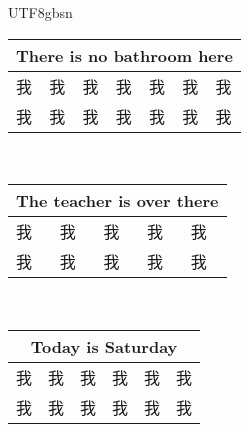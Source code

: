 \documentclass{article}
\newlength\mycolw
\newcommand{\myfont}{gbsn} %
\begin{document}
\begin{CJK}{UTF8}{\myfont}
\begin{tabular}{|p{\mycolw}|p{\mycolw}|p{\mycolw}|p{\mycolw}|p{\mycolw}|p{\mycolw}|p{\mycolw}|}
\multicolumn{7}{|c|}{There is no bathroom here} \\ \hline
\color{white} 我 &\color{white} 我 &\color{white} 我 &\color{white} 我 &\color{white} 我 &\color{white} 我 & \color{white} 我 \\ \hline
\color{white} 我 &\color{white} 我 &\color{white} 我 &\color{white} 我 &\color{white} 我 &\color{white} 我 & \color{white} 我 \\ \hline
\end{tabular}
\\ \vspace{0.3 in}
\setlength{}
\addtolength\mycolw{-2\tabcolsep}
\begin{tabular}{|p{\mycolw}|p{\mycolw}|p{\mycolw}|p{\mycolw}|p{\mycolw}|} \hline
\multicolumn{5}{|c|}{The teacher is over there} \\ \hline
\color{white} 我 &\color{white} 我 &\color{white} 我 &\color{white} 我 & \color{white} 我 \\ \hline
\color{white} 我 &\color{white} 我 &\color{white} 我 &\color{white} 我 & \color{white} 我 \\ \hline
\end{tabular}
\\ \vspace{0.3 in}
\setlength{}
\addtolength\mycolw{-2\tabcolsep}
\begin{tabular}{|p{\mycolw}|p{\mycolw}|p{\mycolw}|p{\mycolw}|p{\mycolw}|p{\mycolw}|} \hline
\multicolumn{6}{|c|}{Today is Saturday} \\ \hline
\color{white} 我 &\color{white} 我 &\color{white} 我 &\color{white} 我 &\color{white} 我 & \color{white} 我 \\ \hline
\color{white} 我 &\color{white} 我 &\color{white} 我 &\color{white} 我 &\color{white} 我 & \color{white} 我 \\ \hline
\end{tabular}
\\ \vspace{0.3 in}

\end{CJK} 
\end{document}
